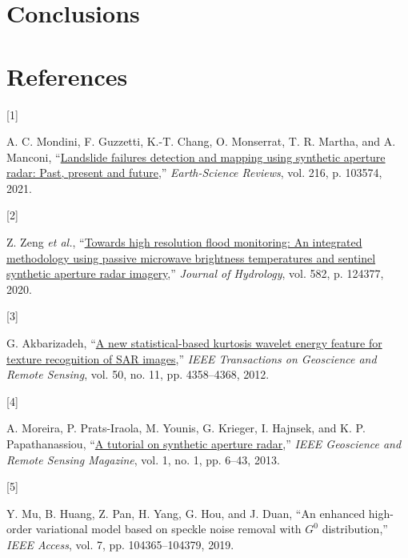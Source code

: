 \documentclass[
  lettersize  journal,
]{IEEEtran}%
\newlength{\cslhangindent}
\newlength{\csllabelwidth}
\newenvironment{CSLReferences}[2] %
 {\begin{list}{}{%
  \setlength{\itemindent}{0pt}
  \setlength{\leftmargin}{0pt}
  \setlength{\parsep}{0pt}
  \ifodd #1
   \setlength{\leftmargin}{\cslhangindent}
   \setlength{\itemindent}{-1\cslhangindent}
  \fi
  \setlength{\itemsep}{#2\baselineskip}}}
 {\end{list}}
\newcommand{\CSLLeftMargin}[1]{\parbox[t]{\csllabelwidth}{\strut#1\strut}}
\newcommand{\CSLRightInline}[1]{\parbox[t]{\linewidth - \csllabelwidth}{\strut#1\strut}}
\begin{document}
\section{Conclusions}\label{sec:conclusion}

\section*{References}\label{references}

\label{refs}
\begin{CSLReferences}{0}{0}
\CSLLeftMargin{{[}1{]} }%
\CSLRightInline{A. C. Mondini, F. Guzzetti, K.-T. Chang, O. Monserrat,
T. R. Martha, and A. Manconi,
{``\href{https://doi.org/10.1016/j.earscirev.2021.103574}{Landslide
failures detection and mapping using synthetic aperture radar: Past,
present and future},''} \emph{Earth-Science Reviews}, vol. 216, p.
103574, 2021. }

\CSLLeftMargin{{[}2{]} }%
\CSLRightInline{Z. Zeng \emph{et al.},
{``\href{https://doi.org/10.1016/j.jhydrol.2019.124377}{Towards high
resolution flood monitoring: An integrated methodology using passive
microwave brightness temperatures and sentinel synthetic aperture radar
imagery},''} \emph{Journal of Hydrology}, vol. 582, p. 124377, 2020. }

\CSLLeftMargin{{[}3{]} }%
\CSLRightInline{G. Akbarizadeh,
{``\href{https://doi.org/10.1109/tgrs.2012.2194787}{A new
statistical-based kurtosis wavelet energy feature for texture
recognition of SAR images},''} \emph{IEEE Transactions on Geoscience and
Remote Sensing}, vol. 50, no. 11, pp. 4358--4368, 2012. }

\CSLLeftMargin{{[}4{]} }%
\CSLRightInline{A. Moreira, P. Prats-Iraola, M. Younis, G. Krieger, I.
Hajnsek, and K. P. Papathanassiou,
{``\href{https://doi.org/10.1109/mgrs.2013.2248301}{A tutorial on
synthetic aperture radar},''} \emph{IEEE Geoscience and Remote Sensing
Magazine}, vol. 1, no. 1, pp. 6--43, 2013. }

\CSLLeftMargin{{[}5{]} }%
\CSLRightInline{Y. Mu, B. Huang, Z. Pan, H. Yang, G. Hou, and J. Duan,
{``An enhanced high-order variational model based on speckle noise
removal with {\(G^0\)} distribution,''} \emph{IEEE Access}, vol. 7, pp.
104365--104379, 2019. }


\end{CSLReferences}
\end{document}

